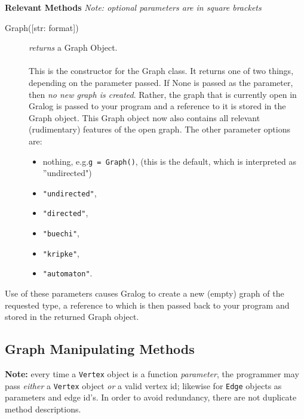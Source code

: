 \documentclass{article}
\newlength\q
\begin{document}
\textbf{{\large Relevant Methods}}
\textit{Note: optional parameters are in square brackets}


\begin{description}
\item[Graph({[str: format]})] \emph{returns} a Graph Object.\\\\
This is the constructor for the Graph class. It returns one of two things, depending on the parameter passed. If None is passed as the parameter, then \textit{no new graph is created}. Rather, the graph that is currently open in Gralog is passed to your program and a reference to it is stored in the Graph object. This Graph object now also contains all relevant (rudimentary) features of the open graph. The other parameter options are:
\begin{itemize}
\item nothing, e.g.\@ \texttt{g = Graph()}, (this is the default, which is interpreted as ''undirected")
\item \texttt{"{}undirected"},
\item \texttt{"directed"},
\item \texttt{"buechi"},
\item \texttt{"kripke"},
\item \texttt{"{}automaton"}.
\end{itemize}
\end{description}

Use of these parameters causes Gralog to create a new (empty) graph of the requested type, a reference to which is then passed back to your program and stored in the returned Graph object.
\subsection{Graph Manipulating Methods}
\textbf{Note:} every time a \texttt{Vertex} object is a function \textit{parameter}, the programmer may pass \textit{either} a \texttt{Vertex} object \textit{or} a valid vertex id; likewise for \texttt{Edge} objects as parameters and edge id's. In order to avoid redundancy, there are not duplicate method descriptions.
\end{document}

